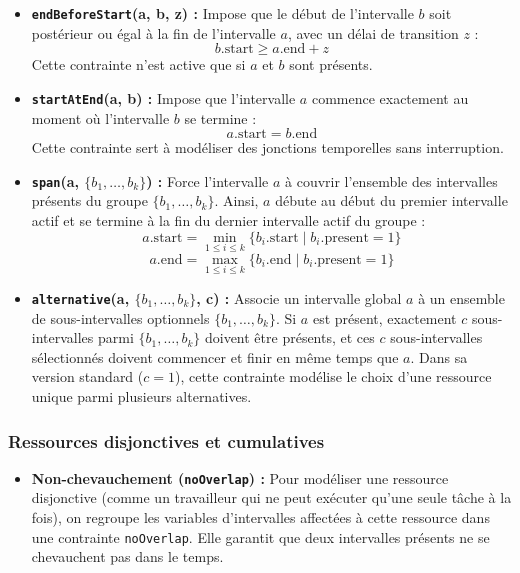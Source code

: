 \begin{itemize}
    \item \textbf{\texttt{endBeforeStart}(a, b, z) :} Impose que le début de l'intervalle $b$ soit postérieur ou égal à la fin de l'intervalle $a$, avec un délai de transition $z$ :
    \begin{equation}
        b.\text{start} \geq a.\text{end} + z
    \end{equation}
    Cette contrainte n'est active que si $a$ et $b$ sont présents.

    \item \textbf{\texttt{startAtEnd}(a, b) :} Impose que l'intervalle $a$ commence exactement au moment où l'intervalle $b$ se termine :
    \begin{equation}
        a.\text{start} = b.\text{end}
    \end{equation}
    Cette contrainte sert à modéliser des jonctions temporelles sans interruption.

    \item \textbf{\texttt{span}(a, $\{b_1, \dots, b_k\}$) :} Force l'intervalle $a$ à couvrir l'ensemble des intervalles présents du groupe $\{b_1, \dots, b_k\}$. Ainsi, $a$ débute au début du premier intervalle actif et se termine à la fin du dernier intervalle actif du groupe :
    \begin{equation}
        a.\text{start} = \min_{1 \le i \le k} \{ b_i.\text{start} \mid b_i.\text{present} = 1 \}
    \end{equation}
    \begin{equation}
        a.\text{end} = \max_{1 \le i \le k} \{ b_i.\text{end} \mid b_i.\text{present} = 1 \}
    \end{equation}

    \item \textbf{\texttt{alternative}(a, $\{b_1, \dots, b_k\}$, c) :} Associe un intervalle global $a$ à un ensemble de sous-intervalles optionnels $\{b_1, \dots, b_k\}$. Si $a$ est présent, exactement $c$ sous-intervalles parmi $\{b_1, \dots, b_k\}$ doivent être présents, et ces $c$ sous-intervalles sélectionnés doivent commencer et finir en même temps que $a$. Dans sa version standard ($c=1$), cette contrainte modélise le choix d'une ressource unique parmi plusieurs alternatives.
\end{itemize}

\subsubsection{Ressources disjonctives et cumulatives}
\begin{itemize}
    \item \textbf{Non-chevauchement (\texttt{noOverlap}) :} Pour modéliser une ressource disjonctive (comme un travailleur qui ne peut exécuter qu'une seule tâche à la fois), on regroupe les variables d'intervalles affectées à cette ressource dans une contrainte \texttt{noOverlap}. Elle garantit que deux intervalles présents ne se chevauchent pas dans le temps.

\end{itemize}

